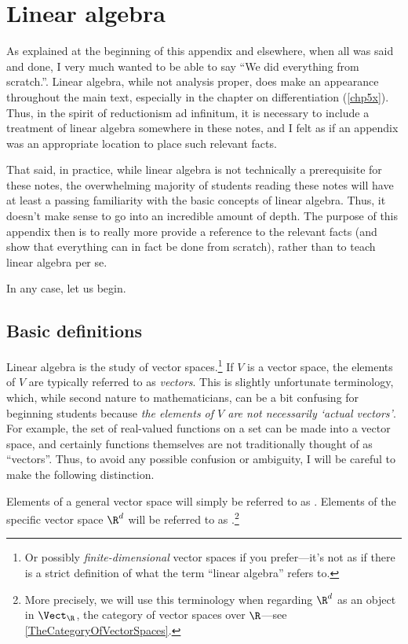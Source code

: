 \cleardoublepage
\chapter{Linear algebra}

As explained at the beginning of this appendix and elsewhere, when all was said and done, I very much wanted to be able to say ``We did everything from scratch.''.  Linear algebra, while not analysis proper, does make an appearance throughout the main text, especially in the chapter on differentiation (\cref{chp5x}).  Thus, in the spirit of reductionism ad infinitum, it is necessary to include a treatment of linear algebra somewhere in these notes, and I felt as if an appendix was an appropriate location to place such relevant facts.

That said, in practice, while linear algebra is not technically a prerequisite for these notes, the overwhelming majority of students reading these notes will have at least a passing familiarity with the basic concepts of linear algebra.  Thus, it doesn't make sense to go into an incredible amount of depth.  The purpose of this appendix then is to really more provide a reference to the relevant facts (and show that everything can in fact be done from scratch), rather than to teach linear algebra per se.

In any case, let us begin.

\section{Basic definitions}

Linear algebra is the study of vector spaces.\footnote{Or possibly \emph{finite-dimensional} vector spaces if you prefer---it's not as if there is a strict definition of what the term ``linear algebra'' refers to.}  If $V$ is a vector space, the elements of $V$ are typically referred to as \emph{vectors}.  This is slightly unfortunate terminology, which, while second nature to mathematicians, can be a bit confusing for beginning students because \emph{the elements of $V$ are not necessarily `actual vectors'}.  For example, the set of real-valued functions on a set can be made into a vector space, and certainly functions themselves are not traditionally thought of as ``vectors''.  Thus, to avoid any possible confusion or ambiguity, I will be careful to make the following distinction.
\begin{important}
Elements of a general vector space will simply be referred to as .  Elements of the specific vector space $\R ^d$ will be referred to as .\footnote{More precisely, we will use this terminology when regarding $\R ^d$ as an object in $\Vect _{\R}$, the category of vector spaces over $\R$---see \cref{TheCategoryOfVectorSpaces}.}
\end{important}


